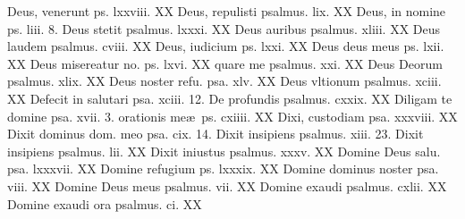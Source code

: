 \documentclass[a5paper,10pt]{book}
\def\ae{æ}
\begin{document}
\begin{multicols}{2}
\newline Deus, venerunt ps. lxxviii. \hfill XX
\newline Deus, repulisti psalmus. lix. \hfill XX
\newline Deus, in nomine ps. liii. \hfill 8.
\newline Deus stetit psalmus. lxxxi. \hfill XX
\newline Deus auribus psalmus. xliii. \hfill XX
\newline Deus laudem psalmus. cviii. \hfill XX
\newline Deus, iudicium ps. lxxi. \hfill XX
\newline Deus deus meus ps. lxii. \hfill XX
\newline Deus misereatur no. ps. lxvi. \hfill XX
\newline \indent quare me psalmus. xxi. \hfill XX
\newline Deus Deorum psalmus. xlix. \hfill XX
\newline Deus noster refu. psa. xlv. \hfill XX
\newline Deus vltionum psalmus. xciii. \hfill XX
\newline Defecit in salutari psa. xciii. \hfill 12.
\newline De profundis psalmus. cxxix. \hfill XX
\newline Diligam te domine psa. xvii. \hfill 3.
\newline \indent orationis me\ae \ ps. cxiiii. \hfill XX
\newline Dixi, custodiam psa. xxxviii. \hfill XX
\newline Dixit dominus dom. meo psa. cix. \hfill 14.
\newline Dixit insipiens psalmus. xiii. \hfill 23.
\newline Dixit insipiens psalmus. lii. \hfill XX
\newline Dixit iniustus psalmus. xxxv. \hfill XX
\newline Domine Deus salu. psa. lxxxvii. \hfill XX
\newline Domine refugium ps. lxxxix. \hfill XX
\newline Domine dominus noster psa. viii. \hfill XX
\newline Domine Deus meus psalmus. vii. \hfill XX
\newline Domine exaudi psalmus. cxlii. \hfill XX
\newline Domine exaudi ora psalmus. ci. \hfill XX

\end{multicols}
\end{document}

